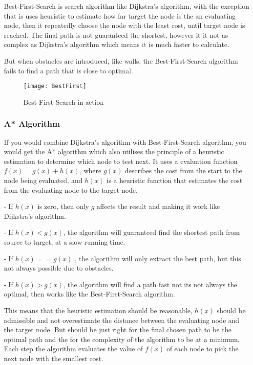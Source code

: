   Best-First-Search is search algorithm like Dijkstra's algorithm, with the exception that is uses heuristic to estimate how far target the node is the an evaluating node, then it repeatedly choose the node with the least cost, until target node is reached.  The final path is not guaranteed the shortest, however it it not as complex as Dijkstra's algorithm which means it is much faster to calculate. \cite{BestFirst}

  But when obstacles are introduced, like walls, the Best-First-Search algorithm fails to find a path that is close to optimal.

  \begin{figure}[ht!]
    \centering
    \texttt{[image: BestFirst]} 
    \caption{Best-First-Search in action}
    \label{bestfirst}
  \end{figure}

  \subsubsection{A* Algorithm}

  If you would combine Dijkstra's algorithm with Best-First-Search algorithm, you would get the A* algorithm which also utilises the principle of a heuristic estimation to determine which node to test next. It uses a evaluation function $f(x) = g(x) + h(x)$, where $g(x)$ describes the cost from the start to the node being evaluated, and $h(x)$ is a heuristic function that estimates the cost from the evaluating node to the target node. \cite{http://theory.stanford.edu/}

  - If $h(x)$ is zero, then only $g$ affects the result and making it work like Dijkstra's algorithm.

  - If $h(x) < g(x)$, the algorithm will guaranteed find the shortest path from source to target, at a slow running time.

  - If $h(x) == g(x)$ , the algorithm will only extract the best path, but this not always possible due to obstacles.

  - If $h(x) > g(x)$, the algorithm will find a path fast not its not always the optimal, then works like the Best-First-Search algorithm.

  This means that the heuristic estimation should be reasonable, $h(x)$ should be admissible and not overestimate the distance between the evaluating node and the target node. But should be just right for the final chosen path to be the optimal path and the for the complexity of the algorithm to be at a minimum. Each step the algorithm evaluates the value of $f(x)$ of each node to pick the next node with the smallest cost.

